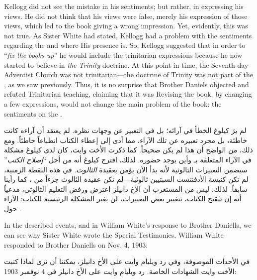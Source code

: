 Kellogg did not see the mistake in his sentiments; but rather, in expressing his views. He did not think that his views were false, merely his expression of those views, which led to the book giving a wrong impression. Yet, evidently, this was not true. As Sister White had stated, Kellogg had a problem with the sentiments regarding the  and where His presence is. So, Kellogg suggested that in order to “\textit{fix the books up}” he would include the trinitarian expressions because he now started to believe in \textit{the Trinity} doctrine. At this point in time, the Seventh-day Adventist Church was not trinitarian—the doctrine of Trinity was not part of the , as we saw previously. Thus, it is no surprise that Brother Daniels objected and refuted Trinitarian teaching, claiming that it was Revising the book, by changing a few expressions, would not change the main problem of the book: the sentiments on the .


لم يرَ كيلوغ الخطأ في آرائه؛ بل في التعبير عن وجهات نظره. لم يعتقد أن آراءه كانت خاطئة، بل مجرد تعبيره عن تلك الآراء، مما أدى إلى إعطاء الكتاب انطباعاً خاطئاً. ومع ذلك، من الواضح أن هذا لم يكن صحيحاً. كما ذكرت الأخت وايت، كان لدى كيلوغ مشكلة في الآراء المتعلقة بـ  وأين يوجد حضوره. لذلك، اقترح كيلوغ أنه من أجل “\textit{إصلاح الكتب}” سيضمن التعبيرات الثالوثية لأنه بدأ الآن يؤمن بعقيدة \textit{الثالوث}. في هذه النقطة الزمنية، لم تكن كنيسة الأدفنتست السبتيين ثالوثية—لم تكن عقيدة الثالوث جزءاً من ، كما رأينا سابقاً. لذلك، ليس من المستغرب أن الأخ دانيلز اعترض ورفض التعليم الثالوثي، مدعياً أنه  إن تنقيح الكتاب، بتغيير بعض التعبيرات، لن يغير المشكلة الرئيسية للكتاب: الآراء حول .


In the described events, and in William White's response to Brother Daniells, we can see why Sister White wrote the Special Testimonies. William White responded to Brother Daniells on Nov. 4, 1903:


في الأحداث الموصوفة، وفي رد ويليام وايت على الأخ دانيلز، يمكننا أن نرى لماذا كتبت الأخت وايت الشهادات الخاصة. رد ويليام وايت على الأخ دانيلز في 4 نوفمبر 1903:








